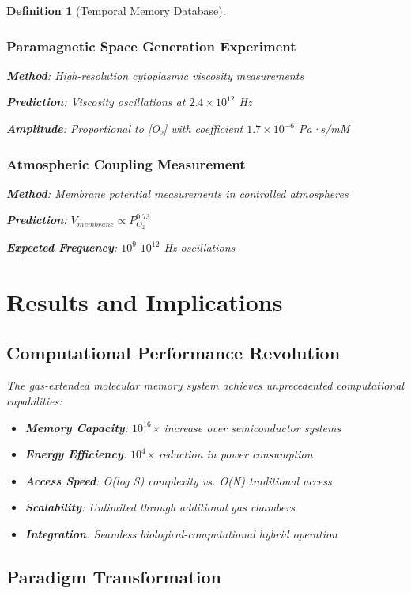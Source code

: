 \documentclass[12pt]{article}
\newtheorem{definition}[theorem]{Definition}
\begin{document}
\begin{definition}[Temporal Memory Database]
\subsubsection{Paramagnetic Space Generation Experiment}

\textbf{Method}: High-resolution cytoplasmic viscosity measurements

\textbf{Prediction}: Viscosity oscillations at $2.4 \times 10^{12}$ Hz

\textbf{Amplitude}: Proportional to [O₂] with coefficient $1.7 \times 10^{-6}$ Pa·s/mM

\subsubsection{Atmospheric Coupling Measurement}

\textbf{Method}: Membrane potential measurements in controlled atmospheres

\textbf{Prediction}: $V_{membrane} \propto P_{O_2}^{0.73}$

\textbf{Expected Frequency}: $10^9$-$10^{12}$ Hz oscillations

\section{Results and Implications}

\subsection{Computational Performance Revolution}

The gas-extended molecular memory system achieves unprecedented computational capabilities:

\begin{itemize}
\item \textbf{Memory Capacity}: $10^{16}$× increase over semiconductor systems
\item \textbf{Energy Efficiency}: $10^{4}$× reduction in power consumption  
\item \textbf{Access Speed}: O(log S) complexity vs. O(N) traditional access
\item \textbf{Scalability}: Unlimited through additional gas chambers
\item \textbf{Integration}: Seamless biological-computational hybrid operation
\end{itemize}

\subsection{Paradigm Transformation}


\end{definition}
\end{document}

